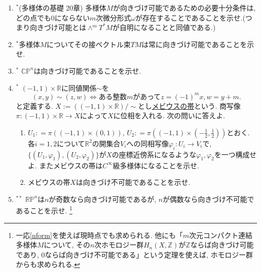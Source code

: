 \documentclass[dvipdfmx,a4paper,11pt]{article}
\newcommand{\R}{\mathbb{R}}
\newcommand{\Z}{\mathbb{Z}}
\newcommand{\C}{\mathbb{C}}
\theoremstyle{definition}
\begin{document}
\begin{enumerate}[label=\textbf{問}3.\arabic*]
\vspace{11pt}
\hspace{-33pt}{\large $\bullet$向きづけの問題}

\item \label{nform} $^{*}$(多様体の基礎 20章)
 多様体$M$が向きづけ可能であるための必要十分条件は, どの点でも0にならない$m$次微分形式$\omega$が存在することであることを示せ.(つまり向きづけ可能とは$\wedge^{m}T^{*}M$が自明になることと同値である.)



\item $^{*}$多様体$M$についてその接ベクトル束$TM$は常に向きづけ可能であることを示せ.

\item $^{*}$ $\C\mathbb{P}^n$は向きづけ可能であることを示せ. %

\item $^{*}$ %
$(-1,1) \times \R$に同値関係$\sim$を
	$$
	(x,y) \sim (z,w)\Leftrightarrow \text{ある整数$m$があって}z = (-1)^m x, w = y+m.
	$$
	と定義する. $X := ((-1,1) \times \R) / \sim$とし\underline{メビウスの帯}という. 商写像$\pi : (-1,1) \times \R \rightarrow X$によって$X$に位相を入れる. 次の問いに答えよ.
	\begin{enumerate}
	 \setlength{\parskip}{0cm}
  \setlength{\itemsep}{2pt} 
  \item $U_1: = \pi( (-1,1) \times (0,1) ) $,  $U_2: = \pi( (-1,1) \times (-\frac{1}{2},\frac{1}{2}) )$とおく. 
各$i=1,2$について$\R^2$の開集合$V_i$への同相写像$\varphi_i : U_i \rightarrow V_i$で, $\{ (U_1, \varphi_1), (U_2, \varphi_2)\}$が$X$の座標近傍系になるような$\varphi_1, \varphi_2$を一つ構成せよ. またメビウスの帯は$C^{\infty}$級多様体になることを示せ.
  \item メビウスの帯$X$は向きづけ不可能であることを示せ.
	\end{enumerate}



\item $^{**}$ $\R \mathbb{P}^n$は$n$が奇数なら向きづけ可能であるが, $n$が偶数なら向きづけ不可能であることを示せ. \footnote{一応\ref{nform}を使えば現時点でも求められる. 他にも「$m$次元コンパクト連結多様体$M$について, その$n$次ホモロジー群$H_{n}(X,\Z)$が$\Z$ならば向きづけ可能であり, $0$ならば向きづけ不可能である」という定理を使えば, ホモロジー群からも求められる. }





\end{enumerate}
\end{document}
